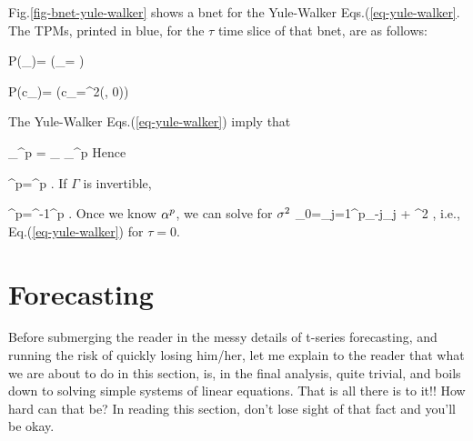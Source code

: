 Fig.\ref{fig-bnet-yule-walker}
shows a bnet 
for the
Yule-Walker 
Eqs.(\ref{eq-yule-walker}.
The TPMs,
printed in blue, for the
$\tau$ time slice of that
bnet, are
as follows:

\beq\color{blue}
P(\gamma_\tau)=
\indi\left(\gamma_\tau=
\right)
\eeq

\beq\color{blue}
P(c_\tau)=
\indi(c_\tau=\s^2\delta(\tau, 0))
\eeq


The Yule-Walker 
Eqs.(\ref{eq-yule-walker})
imply that


\beq
{}_{\gamma^p}
=
_{\Gamma}
_{\alp^p}
\eeq
Hence

\beq
\gamma^p=\Gamma \alp^p
\;.
\eeq
If $\Gamma$
is invertible,

\beq
\alp^p=\Gamma^{-1}\gamma^p
\;.
\eeq
Once we know $\alpha^p$,
we can solve for $\sigma^2$ 
\beq
\gamma_0=\sum_{j=1}^p\gamma_{-j}\alp_j
+ \s^2
\;,
\eeq
i.e., 
Eq.(\ref{eq-yule-walker}) for $\tau=0$.



\section{Forecasting}




Before 
submerging
the reader
in the messy details
of t-series forecasting,
and running
the risk of quickly losing him/her,
let me explain to the reader that
what we are about
to do in this section, is, in the final 
analysis, quite trivial,
and boils down to 
solving simple
systems
of linear equations.
That is all there is to it!!
How hard can that be?
In reading this section,
don't lose sight of that fact and
you'll be okay.

